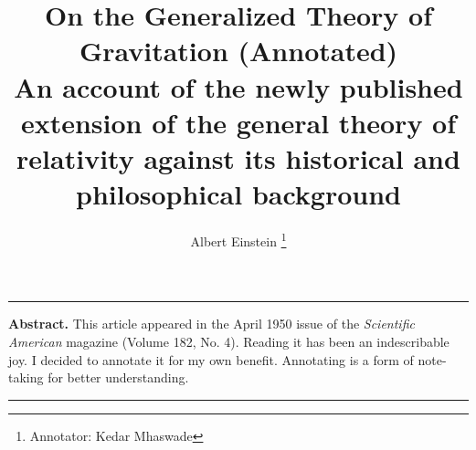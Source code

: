 \documentclass[a4]{article}   %
\begin{document}
\title{On the Generalized Theory of Gravitation (Annotated)\\
\large An account of the newly published extension
of the general theory of relativity against
its historical and philosophical background}
\author{Albert Einstein \thanks{%
    Annotator: Kedar Mhaswade}}
\date{}
\maketitle
\hrule
\vspace{5mm}
\textbf{Abstract.} This article appeared in the April 1950 issue of the \textit{Scientific American} magazine (Volume 182, No. 4). Reading it has been an indescribable joy. I decided to annotate it for my own benefit. Annotating is a form of note-taking for better understanding.
\vspace{5mm}
\hrule
\end{document}
